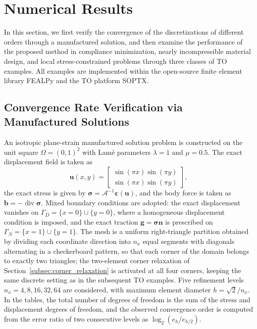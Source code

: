 \section{Numerical Results}
\label{sec:numerical_results}

In this section, we first verify the convergence of the discretizations of different orders through a manufactured solution, and then examine the performance of the proposed method in compliance minimization, nearly incompressible material design, and local stress-constrained problems through three classes of TO examples. All examples are implemented within the open-source finite element library FEALPy and the TO platform SOPTX.

\subsection{Convergence Rate Verification via Manufactured Solutions}
\label{subsec:manufactured_solutions}

An isotropic plane-strain manufactured solution problem is constructed on the unit square $\Omega=(0,1)^2$ with Lam\'e parameters $\lambda=1$ and $\mu=0.5$. The exact displacement field is taken as
\begin{equation*}
\boldsymbol{u}(x,y) =
\begin{bmatrix}
\sin(\pi x)\sin(\pi y) \\
\sin(\pi x)\sin(\pi y)
\end{bmatrix},
\end{equation*}
the exact stress is given by $\boldsymbol{\sigma}=\mathcal{A}^{-1}\boldsymbol{\varepsilon}(\boldsymbol{u})$, and the body force is taken as $\boldsymbol{b}=-\operatorname{div}\boldsymbol{\sigma}$. Mixed boundary conditions are adopted: the exact displacement vanishes on $\Gamma_D=\{x=0\}\cup\{y=0\}$, where a homogeneous displacement condition is imposed, and the exact traction $\boldsymbol{g}=\boldsymbol{\sigma}\boldsymbol{n}$ is prescribed on $\Gamma_N=\{x=1\}\cup\{y=1\}$. The mesh is a uniform right-triangle partition obtained by dividing each coordinate direction into $n_x$ equal segments with diagonals alternating in a checkerboard pattern, so that each corner of the domain belongs to exactly two triangles; the two-element corner relaxation of Section~\ref{subsec:corner_relaxation} is activated at all four corners, keeping the same discrete setting as in the subsequent TO examples. Five refinement levels $n_x=4,8,16,32,64$ are considered, with maximum element diameter $h=\sqrt{2}/n_x$. In the tables, the total number of degrees of freedom is the sum of the stress and displacement degrees of freedom, and the observed convergence order is computed from the error ratio of two consecutive levels as $\log_2(e_h/e_{h/2})$.

